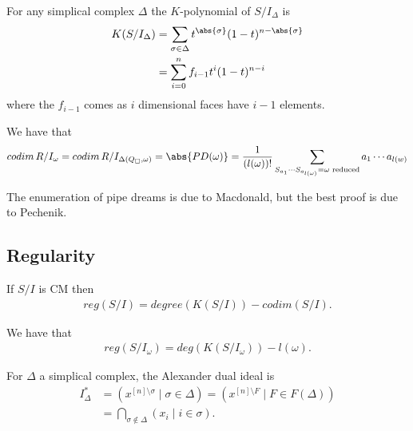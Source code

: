 \begin{theorem}
    For any simplical complex $\Delta$ the $K$-polynomial of $S / I_\Delta $ is 
    \begin{align*}
        K(S / I_\Delta ) &= \sum_{\sigma \in \Delta } t^{\abs{\sigma } } (1-t)^{n - \abs{\sigma}}\\
        &= \sum_{i=0 }^n f_{i-1} t^i (1-t)^{n-i}
    \end{align*}
    where the $f_{i-1}$ comes as $i$ dimensional faces have $i-1$ elements.
\end{theorem}

\begin{corollary}
We have that
    \begin{align*}
        codim \,R / I_\omega  = codim \, R/ I_{\Delta (Q_\square , \omega) } = \abs{ PD(\omega)} = \frac{1}{(l(\omega ))!} \sum_{S_{a_{1}} \cdots S_{a_{l(\omega)} } = \omega \text{ reduced} } a_1 \cdots a_{l(w)} 
    \end{align*}
\end{corollary}

The enumeration of pipe dreams is due to Macdonald, but the best proof is due to Pechenik.

\subsection{Regularity}

\begin{theorem}
    If $S/ I$ is CM then
    \begin{align*}
        reg (S/I ) = degree (K( S/I) ) - codim (S/I).
    \end{align*}
\end{theorem}

\begin{corollary}
    We have that
    \begin{align*}
        reg (S/I_\omega) = deg( K(S/I_\omega) ) - l(\omega).
    \end{align*}
\end{corollary}

\begin{definition}
    For $\Delta $ a simplical complex, the Alexander dual ideal is 
    \begin{align*}
        I_\Delta^* &= ( x^{[n] \setminus \sigma } \mid \sigma \in \Delta  ) = ( x^{[n] \setminus F } \mid F \in F(\Delta ) )\\
        &= \bigcap_{\sigma \notin \Delta } (x_i \mid i \in \sigma).
    \end{align*} 
\end{definition}

